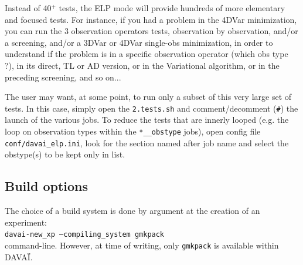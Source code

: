 \documentclass[a4paper,10pt,twoside]{article}
\begin{document}
\noindent Instead of 40$^+$ tests, the ELP mode will provide hundreds of more elementary and focused tests. For instance, if you had a problem in the 4DVar minimization, you can run the 3 observation operators tests, observation by observation, and/or a screening, and/or a 3DVar or 4DVar single-obs minimization, in order to understand if the problem is in a specific observation operator (which obs type ?), in its direct, TL or AD version, or in the Variational algorithm, or in the preceding screening, and so on...

The user may want, at some point, to run only a subset of this very large set of tests. In this case, simply open the \texttt{2.tests.sh} and comment/decomment (\texttt{\#}) the launch of the various jobs.
To reduce the tests that are innerly looped (e.g. the loop on observation types within the \texttt{*\_\_obstype} jobs), open config file \texttt{conf/davai\_elp.ini}, look for the section named after job name and select the obstype(s) to be kept only in list.


\subsection{Build options}
The choice of a build system is done by argument at the creation of an experiment:\\
\texttt{davai-new\_xp --compiling\_system gmkpack}\\
command-line. However, at time of writing, only \texttt{gmkpack} is available within DAVAÏ.
\end{document}
